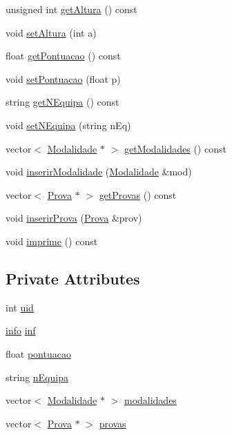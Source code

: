 \begin{DoxyCompactItemize}
\item 
unsigned int \hyperlink{class_atleta_a8ad4b5fcf8bb3cf4bdf6f428728c5ebc}{get\+Altura} () const 
\item 
void \hyperlink{class_atleta_a559420bb8aa5e5ee881ffe284f24a7df}{set\+Altura} (int a)
\item 
float \hyperlink{class_atleta_afc8a2e69817d94c7dad61a66928d98f6}{get\+Pontuacao} () const 
\item 
void \hyperlink{class_atleta_a4bacfffad058d3437083a4a53fd2169c}{set\+Pontuacao} (float p)
\item 
string \hyperlink{class_atleta_aea91ba91e81827418585318e081a7e82}{get\+N\+Equipa} () const 
\item 
void \hyperlink{class_atleta_ae6f75c0295ae244256caab4af4345fae}{set\+N\+Equipa} (string n\+Eq)
\item 
vector$<$ \hyperlink{class_modalidade}{Modalidade} $\ast$ $>$ \hyperlink{class_atleta_a4e4a08618d388c914705e4552bee3f00}{get\+Modalidades} () const 
\item 
void \hyperlink{class_atleta_ad0d0e9f9f781ddfce8b628dcd57d2a6e}{inserir\+Modalidade} (\hyperlink{class_modalidade}{Modalidade} \&mod)
\item 
vector$<$ \hyperlink{class_prova}{Prova} $\ast$ $>$ \hyperlink{class_atleta_a4d87755e5d458d4a2c5d53015669ad21}{get\+Provas} () const 
\item 
void \hyperlink{class_atleta_aba485676bf190d09e19044660b2af329}{inserir\+Prova} (\hyperlink{class_prova}{Prova} \&prov)
\item 
void \hyperlink{class_atleta_abfac40f3ca907a1b89152794a5a29f96}{imprime} () const 
\end{DoxyCompactItemize}
\subsection*{Private Attributes}
\begin{DoxyCompactItemize}
\item 
int \hyperlink{class_atleta_ae471f8c198a8a84275afa23598e03d44}{uid}
\item 
\hyperlink{structinfo}{info} \hyperlink{class_atleta_a1492a3f905e1915797e128b7e0be8017}{inf}
\item 
float \hyperlink{class_atleta_ac7fb325ccbe94fe9494d54da4c08b045}{pontuacao}
\item 
string \hyperlink{class_atleta_af159b255beef6455905f0c871355b1ee}{n\+Equipa}
\item 
vector$<$ \hyperlink{class_modalidade}{Modalidade} $\ast$ $>$ \hyperlink{class_atleta_a0f04a0dcd8724d10617db7b1e2482e1c}{modalidades}
\item 
vector$<$ \hyperlink{class_prova}{Prova} $\ast$ $>$ \hyperlink{class_atleta_aefafb252cadc4ab80434bb697674e865}{provas}
\end{DoxyCompactItemize}
